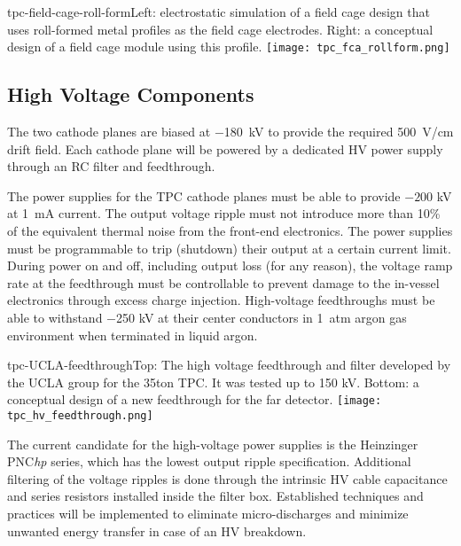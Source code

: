 \begin{cdrfigure}{tpc-field-cage-roll-form}{Left: electrostatic simulation of a field cage design that uses roll-formed metal profiles as the field cage electrodes.  Right: a conceptual design of a field cage module using this profile.}
\texttt{[image: tpc\_fca\_rollform.png]}
\end{cdrfigure}


\subsection{High Voltage Components}  
\label{subsec:fd-ref-hv}
   
The two cathode planes are biased at $-$180~kV to provide the required 
500~V/cm drift field. Each cathode plane will be powered by a dedicated HV power supply through an RC filter and feedthrough.

The power supplies for the TPC cathode planes must be able to provide $-200$ kV at 1~mA current. The output voltage ripple 
must not introduce more than 10\% of the equivalent thermal noise from the front-end electronics. 
The power supplies must be programmable to trip (shutdown) their output at a certain current limit.  During power on and off, 
including output loss (for any reason), the voltage ramp rate at the feedthrough must be controllable to prevent 
damage to the in-vessel electronics through excess charge injection.  High-voltage feedthroughs must be able to withstand $-$250 kV 
at their center conductors in 1~atm argon gas environment when terminated in liquid argon.

\begin{cdrfigure}{tpc-UCLA-feedthrough}{Top: The high voltage feedthrough and filter developed by the UCLA 
group for the 35ton TPC.  It was tested up to 150 kV.  Bottom: a conceptual design of a new feedthrough for the far detector.}
\texttt{[image: tpc\_hv\_feedthrough.png]}
\end{cdrfigure}

The current candidate for the high-voltage power supplies is 
the Heinzinger PNC{\it hp} series, which has the lowest output ripple specification.  Additional filtering of the voltage ripples is done through the intrinsic HV cable capacitance and series resistors installed inside the filter box. Established techniques and practices will be implemented to eliminate micro-discharges and minimize unwanted energy transfer in case of an HV breakdown. 
  
